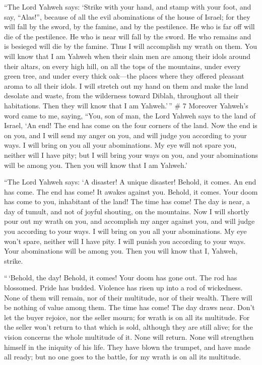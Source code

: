  ``The Lord Yahweh says: `Strike with your hand, and stamp
with your foot, and say, ``Alas!'', because of all the evil abominations
of the house of Israel; for they will fall by the sword, by the famine,
and by the pestilence.  He who is far off will die of the
pestilence. He who is near will fall by the sword. He who remains and is
besieged will die by the famine. Thus I will accomplish my wrath on
them.  You will know that I am Yahweh when their slain men
are among their idols around their altars, on every high hill, on all
the tops of the mountains, under every green tree, and under every thick
oak---the places where they offered pleasant aroma to all their idols.
 I will stretch out my hand on them and make the land
desolate and waste, from the wilderness toward Diblah, throughout all
their habitations. Then they will know that I am Yahweh.'\,'' \# 7
 Moreover Yahweh's word came to me, saying, 
``You, son of man, the Lord Yahweh says to the land of Israel, `An end!
The end has come on the four corners of the land.  Now the
end is on you, and I will send my anger on you, and will judge you
according to your ways. I will bring on you all your abominations.
 My eye will not spare you, neither will I have pity; but I
will bring your ways on you, and your abominations will be among you.
Then you will know that I am Yahweh.'

 ``The Lord Yahweh says: `A disaster! A unique disaster!
Behold, it comes.  An end has come. The end has come! It
awakes against you. Behold, it comes.  Your doom has come to
you, inhabitant of the land! The time has come! The day is near, a day
of tumult, and not of joyful shouting, on the mountains. 
Now I will shortly pour out my wrath on you, and accomplish my anger
against you, and will judge you according to your ways. I will bring on
you all your abominations.  My eye won't spare, neither will
I have pity. I will punish you according to your ways. Your abominations
will be among you. Then you will know that I, Yahweh, strike.

 ``\,`Behold, the day! Behold, it comes! Your doom has gone
out. The rod has blossomed. Pride has budded.  Violence has
risen up into a rod of wickedness. None of them will remain, nor of
their multitude, nor of their wealth. There will be nothing of value
among them.  The time has come! The day draws near. Don't
let the buyer rejoice, nor the seller mourn; for wrath is on all its
multitude.  For the seller won't return to that which is
sold, although they are still alive; for the vision concerns the whole
multitude of it. None will return. None will strengthen himself in the
iniquity of his life.  They have blown the trumpet, and
have made all ready; but no one goes to the battle, for my wrath is on
all its multitude.

